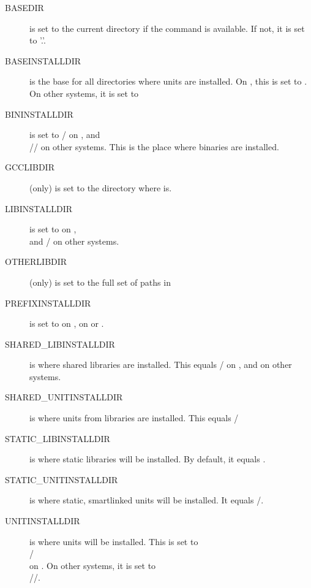 \documentclass{report}
\begin{document}
\begin{description}
\item[BASEDIR] is set to the current directory if the  command is
available. If not, it is set to '.'.

\item[BASEINSTALLDIR] is the base for all directories where units are
installed. On \linux, this is set to
.\\ On other systems,
it is set to 

\item[BININSTALLDIR] is set to / on \linux,
and\\
// on other systems. This is
the place where binaries are installed.

\item[GCCLIBDIR] (\linux only) is set to the directory where 
is.

\item[LIBINSTALLDIR] is set to  on \linux,\\
 and / on other systems.

\item[OTHERLIBDIR] (\linux only) is set to the full set of paths in 

\item[PREFIXINSTALLDIR] is set to  on \linux,  on \dos
or \windowsnt.

\item[SHARED\_LIBINSTALLDIR] is where shared libraries are
installed. This equals / on \linux, and
 on other systems.

\item[SHARED\_UNITINSTALLDIR] is where units from libraries are
installed. This equals /

\item[STATIC\_LIBINSTALLDIR] is where static libraries will be
installed. By default, it equals .

\item[STATIC\_UNITINSTALLDIR] is where static, smartlinked units will be
installed. It equals /.

\item[UNITINSTALLDIR] is where units will be installed. This is set to\\
/ \\
on \linux. On other systems, it is set to \\
//.
\end{description}
\end{document}
